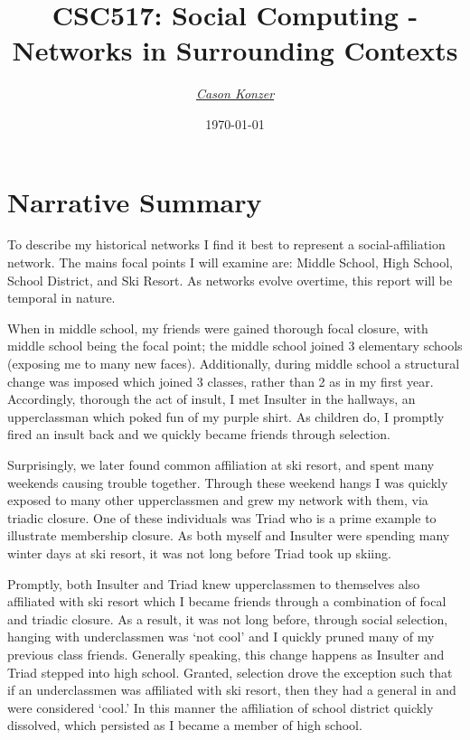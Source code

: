\documentclass[12pt]{article}
\newcommand{\XB}{\color{black}}
\newcommand{\XV}{\color{violet}}
\begin{document}
\title{\textbf{CSC517}: Social Computing - \\ Networks in Surrounding Contexts}
\date{\today}
\author{\XV\textit{\large{\href{https://github.com/casonk}{Cason Konzer}}}\XB}

\maketitle
\hrulefill
\vfill

\pagebreak

\tableofcontents

\newpage

\section{Narrative Summary}
To describe my historical networks I find it best to represent a social-affiliation network.
The mains focal points I will examine are: Middle School, High School, School District, and Ski Resort.
As networks evolve overtime, this report will be temporal in nature.

When in middle school, my friends were gained thorough focal closure, with middle school being the focal point; the middle school joined 3 elementary schools (exposing me to many new faces).
Additionally, during middle school a structural change was imposed which joined 3 classes, rather than 2 as in my first year.
Accordingly, thorough the act of insult, I met Insulter in the hallways, an upperclassman which poked fun of my purple shirt.
As children do, I promptly fired an insult back and we quickly became friends through selection.

Surprisingly, we later found common affiliation at ski resort, and spent many weekends causing trouble together.
Through these weekend hangs I was quickly exposed to many other upperclassmen and grew my network with them, via triadic closure.
One of these individuals was Triad who is a prime example to illustrate membership closure.
As both myself and Insulter were spending many winter days at ski resort, it was not long before Triad took up skiing.

Promptly, both Insulter and Triad knew upperclassmen to themselves also affiliated with ski resort which I became friends through a combination of focal and triadic closure.
As a result, it was not long before, through social selection, hanging with underclassmen was `not cool' and I quickly pruned many of my previous class friends.
Generally speaking, this change happens as Insulter and Triad stepped into high school.
Granted, selection drove the exception such that if an underclassmen was affiliated with ski resort, then they had a general in and were considered `cool.'
In this manner the affiliation of school district quickly dissolved, which persisted as I became a member of high school.
\end{document}
